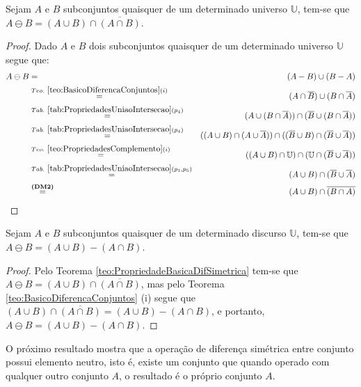 \begin{teorema}\label{teo:PropriedadeBasicaDifSimetrica}
	Sejam $A$ e $B$ subconjuntos quaisquer de um determinado universo $\mathbb{U}$, tem-se que $A \ominus B = (A \cup B) \cap \overline{(A \cap B)}$.
\end{teorema}

\begin{proof}
	Dado $A$ e $B$ dois subconjuntos quaisquer de um determinado universo $\mathbb{U}$ segue que:
	\begin{eqnarray*}
		A \ominus B & = &  (A - B) \cup (B - A)\\
		& \stackrel{Teo. \  \ref{teo:BasicoDiferencaConjuntos}(i)}{=} & (A \cap \overline{B}) \cup (B \cap \overline{A})\\
		& \stackrel{Tab. \ \ref{tab:PropriedadesUniaoIntersecao}(p_4)}{=}& (A \cup (B \cap \overline{A})) \cap (\overline{B} \cup (B \cap \overline{A}))\\
		& \stackrel{Tab. \ \ref{tab:PropriedadesUniaoIntersecao}(p_4)}{=}& ((A \cup B) \cap (A \cup \overline{A})) \cap ((\overline{B} \cup B) \cap (\overline{B} \cup \overline{A}))\\
		& \stackrel{Teo. \ \ref{teo:PropriedadesComplemento}(i)}{=}& ((A \cup B) \cap \mathbb{U}) \cap (\mathbb{U} \cap (\overline{B} \cup \overline{A}))\\
		& \stackrel{Tab. \ \ref{tab:PropriedadesUniaoIntersecao}(p_1, p_5)}{=}& (A \cup B) \cap (\overline{B} \cup \overline{A})\\
		& \stackrel{\textbf{(DM2)}}{=}& (A \cup B) \cap \overline{(B \cap A)}
	\end{eqnarray*}
\end{proof}

\begin{corolario}\label{col:DiferencaSimetrica}
  Sejam $A$ e $B$ subconjuntos quaisquer de um determinado discurso $\mathbb{U}$, tem-se que $A \ominus B = (A \cup B) - (A \cap B)$.
\end{corolario}

\begin{proof}
	Pelo Teorema \ref{teo:PropriedadeBasicaDifSimetrica} tem-se que $A \ominus B = (A \cup B) \cap \overline{(A \cap B)}$, mas pelo Teorema \ref{teo:BasicoDiferencaConjuntos} (i) segue que $(A \cup B) \cap \overline{(A \cap B)} = (A \cup B) - (A \cap B)$, e portanto, $A \ominus B = (A \cup B) - (A \cap B)$.
\end{proof}

O próximo resultado mostra que a operação de diferença simétrica entre conjunto possui elemento neutro, isto é, existe um conjunto que quando operado com qualquer outro conjunto $A$, o resultado é o próprio conjunto $A$.

